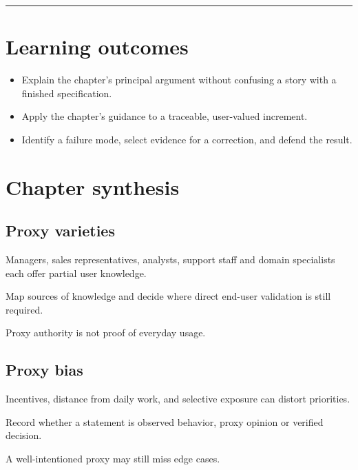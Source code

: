 \documentclass[11pt,letterpaper]{article}
\begin{document}
\tableofcontents\medskip\noindent\rule{\linewidth}{0.4pt}\medskip
\section{Learning outcomes}
\begin{itemize}[leftmargin=*,itemsep=2pt]
\item Explain the chapter's principal argument without confusing a story with a finished specification.
\item Apply the chapter's guidance to a traceable, user-valued increment.
\item Identify a failure mode, select evidence for a correction, and defend the result.
\end{itemize}
\section{Chapter synthesis}
\subsection{Proxy varieties}
Managers, sales representatives, analysts, support staff and domain specialists each offer partial user knowledge.

\begin{tcolorbox}[colback=tealback,colframe=navy,title={Engineering translation},breakable]
Map sources of knowledge and decide where direct end-user validation is still required.

\end{tcolorbox}
\begin{tcolorbox}[colback=amberback,colframe=navy,title={Failure mode to watch},breakable]
Proxy authority is not proof of everyday usage.

\end{tcolorbox}
\subsection{Proxy bias}
Incentives, distance from daily work, and selective exposure can distort priorities.

\begin{tcolorbox}[colback=tealback,colframe=navy,title={Engineering translation},breakable]
Record whether a statement is observed behavior, proxy opinion or verified decision.

\end{tcolorbox}
\begin{tcolorbox}[colback=amberback,colframe=navy,title={Failure mode to watch},breakable]
A well-intentioned proxy may still miss edge cases.

\end{tcolorbox}
\end{document}
